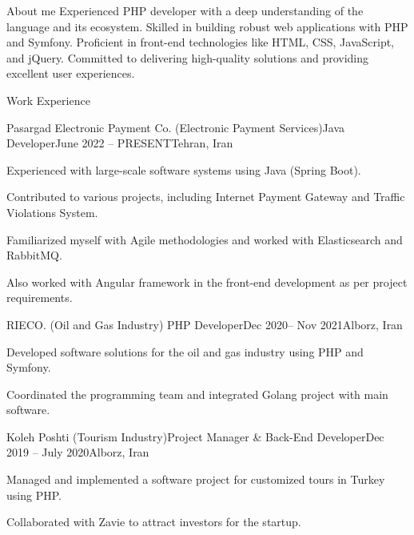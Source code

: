 \documentclass[]{kyvernitis-resume}
\begin{document}
\resumeheader
{}
{}
{}
{}
{\address{Karaj, Alborz Province, Iran}}
{}

\begin{section}{About me}
Experienced PHP developer with a deep understanding of the language and its ecosystem. Skilled in building robust web applications with PHP and Symfony. Proficient in front-end technologies like HTML, CSS, JavaScript, and jQuery. Committed to delivering high-quality solutions and providing excellent user experiences.
\end{section}

\begin{section}{Work Experience}
\begin{subsection}{Pasargad Electronic Payment Co. (Electronic Payment Services)}{Java Developer}{June 2022 -- PRESENT}{Tehran, Iran}
\item Experienced with large-scale software systems using Java (Spring Boot).
\item Contributed to various projects, including Internet Payment Gateway and Traffic Violations System.
\item Familiarized myself with Agile methodologies and worked with Elasticsearch and RabbitMQ.
\item Also worked with Angular framework in the front-end development as per project requirements.
\end{subsection}

\begin{subsection}{RIECO.  (Oil and Gas Industry) }{PHP Developer}{Dec 2020-- Nov 2021}{Alborz, Iran}
   	\item Developed software solutions for the oil and gas industry using PHP and Symfony.
\item Coordinated the programming team and integrated Golang project with main software.
\end{subsection}

\begin{subsection}{Koleh Poshti  (Tourism Industry)}{Project Manager \& Back-End Developer}{Dec 2019 -- July 2020}{Alborz, Iran}
\item Managed and implemented a software project for customized tours in Turkey using PHP.
\item Collaborated with Zavie to attract investors for the startup.
\end{subsection}


\end{section}
\end{document}
